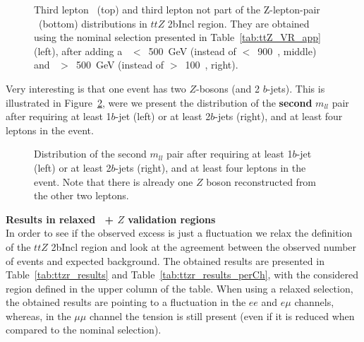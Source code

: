 \begin{figure}[h!]
\centering
{}
\caption{Third lepton \pt\  (top) and third lepton not part of the Z-lepton-pair \pt\ (bottom) distributions in $ttZ$ 2bIncl region. They are obtained using the nominal selection presented in Table~\ref{tab:ttZ_VR_app} (left), after adding a \meff~$<$~500~GeV (instead of $<$~900~\GeV, middle) and \meff~$>$~500~GeV (instead of $>$~100~\GeV, right).}
\label{fig:Results_VR2bttZ_more_2}
\end{figure}

Very interesting is that one event has two $Z$-bosons (and 2 $b$-jets). This is illustrated in Figure~\ref{fig:Results_VR2bttZ_mSecondZ}, were we present the distribution of the \textbf{second} $m_{ll}$ pair after requiring at least 1$b$-jet (left) or at least 2$b$-jets (right), and at least four leptons in the event. 
\begin{figure}[h!]
\centering 
{}
\caption{Distribution of the second $m_{ll}$ pair after requiring at least 1$b$-jet (left) or at least 2$b$-jets (right), and at least four leptons in the event. Note that  there is already one $Z$ boson reconstructed from the other two leptons.}
\label{fig:Results_VR2bttZ_mSecondZ} 
\end{figure} 


\clearpage 
\par{\bf Results in relaxed \ttbar\ + $Z$ validation regions\\}
In order to see if the observed excess is just a fluctuation we relax the definition of the $ttZ$ 2bIncl region and look at the agreement between the observed number of events and expected background. The obtained results are presented in Table~\ref{tab:ttzr_results} and Table~\ref{tab:ttzr_results_perCh}, with the considered region defined in the upper column of the table. When using a relaxed selection, the obtained results are pointing to a fluctuation in the $ee$ and $e\mu$ channels, whereas, in the $\mu\mu$ channel the tension is still present (even if it is reduced when compared to the nominal selection). 

